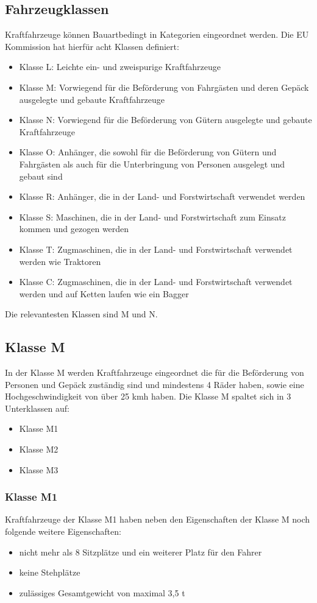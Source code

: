 \subsection{Fahrzeugklassen}

Kraftfahrzeuge können Bauartbedingt in Kategorien eingeordnet werden.
Die EU Kommission hat hierfür acht Klassen definiert\cite{VERORDNUNG}:

\begin{itemize}
	\item Klasse L: Leichte ein- und zweispurige Kraftfahrzeuge
	\item Klasse M: Vorwiegend für die Beförderung von Fahrgästen und deren Gepäck ausgelegte und gebaute Kraftfahrzeuge
	\item Klasse N: Vorwiegend für die Beförderung von Gütern ausgelegte und gebaute Kraftfahrzeuge
	\item Klasse O: Anhänger, die sowohl für die Beförderung von Gütern und Fahrgästen als auch für die Unterbringung von Personen ausgelegt und gebaut sind
	\item Klasse R: Anhänger, die in der Land- und Forstwirtschaft verwendet werden
	\item Klasse S: Maschinen, die in der Land- und Forstwirtschaft zum Einsatz kommen und gezogen werden
	\item Klasse T: Zugmaschinen, die in der Land- und Forstwirtschaft verwendet werden wie Traktoren
	\item Klasse C: Zugmaschinen, die in der Land- und Forstwirtschaft verwendet werden und auf Ketten laufen wie ein Bagger
\end{itemize}

Die relevantesten Klassen sind M und N.

\subsection*{Klasse M}
In der Klasse M werden Kraftfahrzeuge eingeordnet die für die Beförderung von Personen und Gepäck zuständig sind und mindestens 4 Räder haben,
sowie eine Hochgeschwindigkeit von über 25 \ac{kmh} haben.
\newline
Die Klasse M spaltet sich in 3 Unterklassen auf:
\begin{itemize}
	\item {Klasse M1}
	\item {Klasse M2}
	\item {Klasse M3}
\end{itemize}
\subsubsection{Klasse M1}
Kraftfahrzeuge der Klasse M1 haben neben den Eigenschaften der Klasse M noch folgende weitere Eigenschaften:
\begin{itemize}
	\item {nicht mehr als 8 Sitzplätze und ein weiterer Platz für den Fahrer}
	\item {keine Stehplätze}
	\item {zulässiges Gesamtgewicht von maximal 3,5 \ac{t}}
\end{itemize}

